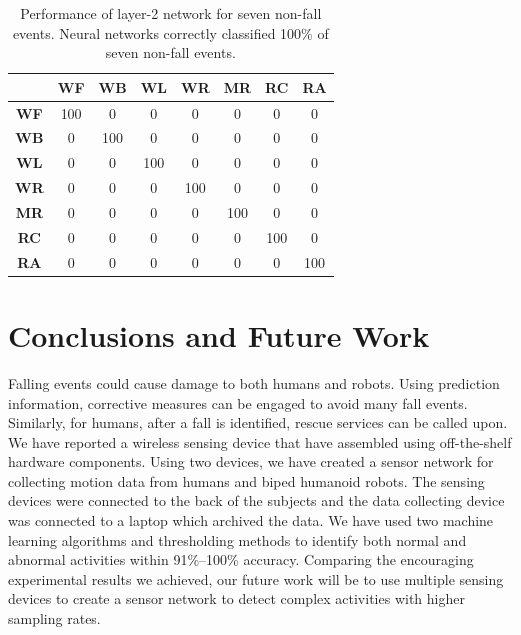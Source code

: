 \documentclass{IEEEtran}
\begin{document}
\begin{table}[htb]
\caption{Performance of layer-2 network for  seven non-fall events. Neural networks correctly classified 100\% of  seven non-fall events.}
\label{Layer2NonFallEventsNeuralNets}
\centering
{
\begin{tabular}{|c|c|c|c|c|c|c|c|}
\hline 
 & \textbf{WF} & \textbf{WB} & \textbf{WL} & \textbf{WR} & \textbf{MR} & 
\textbf{RC} & \textbf{RA} \\ \hline 
\textbf{WF} & 100 &  0 &  0 &  0 &  0 &  0 &  0 \\ \hline
\textbf{WB} & 0 &  100 &  0 &  0 &  0 &  0 &  0 \\ \hline
\textbf{WL} & 0 &  0 &  100 &  0 &  0 &  0 &  0 \\ \hline
\textbf{WR} & 0 &  0 &  0 &  100 &  0 &  0 &  0 \\ \hline
\textbf{MR} & 0 &  0 &  0 &  0 &  100 &  0 &  0 \\ \hline
\textbf{RC} & 0 &  0 &  0 &  0 &  0 &  100 &  0 \\ \hline
\textbf{RA} & 0 &  0 &  0 &  0 &  0 &  0 &  100 \\ \hline
\end{tabular}
}
\end{table}



\section{Conclusions and Future Work}

Falling events could cause damage to both humans and robots.  Using prediction information, 
corrective measures can be engaged to avoid 
 many fall events. Similarly, for humans, after  a fall is identified, rescue services 
 can be called upon. We have reported a wireless sensing device that have assembled using 
off-the-shelf hardware components. Using two devices, we have created a sensor network for 
collecting motion data from humans and biped humanoid robots. The sensing devices were connected to 
the back of the subjects and the data collecting device was connected to a laptop which archived 
the data. We have used two machine learning algorithms and thresholding methods to 
identify both normal and abnormal activities within 91\%--100\% accuracy. Comparing the encouraging 
experimental results we achieved, our future work will be to use multiple sensing devices to create 
a sensor network to detect complex activities with higher sampling rates.  




\end{document}
